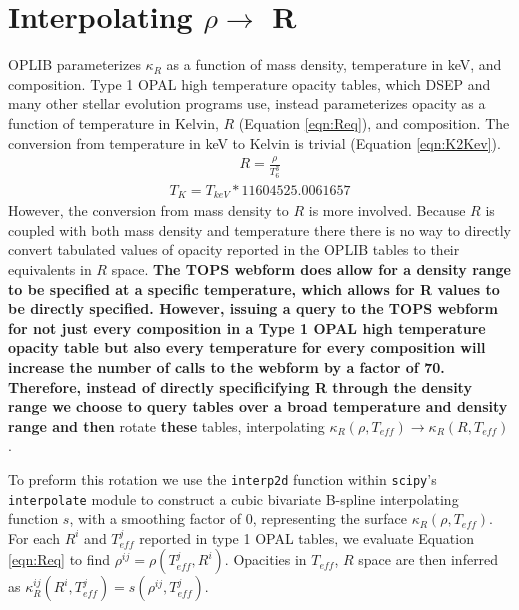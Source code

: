 \section{Interpolating $\rho \rightarrow $ R}\label{apx:interp}
OPLIB parameterizes $\kappa_{R}$ as a function of mass density, temperature in keV,
and composition. Type 1 OPAL high temperature opacity tables, which DSEP and
many other stellar evolution programs use, instead parameterizes opacity as a function
of temperature in Kelvin, $R$ (Equation \ref{eqn:Req}), and composition. The
conversion from temperature in keV to Kelvin is trivial (Equation
\ref{eqn:K2Kev}).
\begin{align}\label{eqn:Req}
	R = \frac{\rho}{T_{6}^{3}}
\end{align}
\begin{align}\label{eqn:K2Kev}
	T_{K} = T_{keV} * 11604525.0061657
\end{align}
However, the conversion from mass density to $R$ is more involved. Because $R$
is coupled with both mass density and temperature there there is no way to
directly convert tabulated values of opacity reported in the OPLIB tables to
their equivalents in $R$ space. \textbf{The TOPS webform does allow for a
density range to be specified at a specific temperature, which allows for R
values to be directly specified. However, issuing a query to the TOPS webform
for not just every composition in a Type 1 OPAL high temperature opacity table
but also every temperature for every composition will increase the number of
calls to the webform by a factor of 70. Therefore, instead of directly
specificifying R through the density range we choose to query tables over a
broad temperature and density range and then} rotate \textbf{these} tables,
interpolating $\kappa_{R}(\rho,T_{eff}) \rightarrow \kappa_{R}(R,T_{eff})$. 


To preform this rotation we use the \texttt{interp2d} function within
\texttt{scipy}'s \texttt{interpolate} \citep{2020SciPy-NMeth} module to
construct a cubic bivariate B-spline \citep{Dierckx1981} interpolating function
$s$, with a smoothing factor of 0, representing the surface $\kappa_{R}(\rho,
T_{eff})$. For each $R^{i}$ and $T^{j}_{eff}$ reported in type 1 OPAL tables,
we evaluate Equation \ref{eqn:Req} to find $\rho^{ij} =
\rho(T^{j}_{eff},R^{i})$.  Opacities in $T_{eff}$, $R$ space are then inferred
as $\kappa^{ij}_{R}(R^{i},T^{j}_{eff}) = s(\rho^{ij}, T^{j}_{eff})$. 

